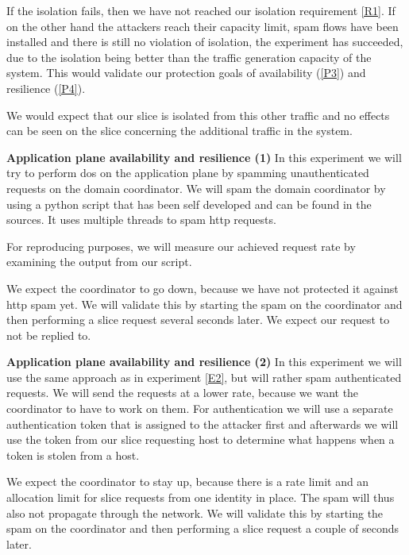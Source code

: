 \begin{description}[style=multiline, labelwidth=0.7cm]
    If the isolation fails, then we have not reached our isolation requirement \ref{R1}. If on the other hand the attackers reach their capacity limit, spam flows have been installed and there is still no violation of isolation, the experiment has succeeded, due to the isolation being better than the traffic generation capacity of the system. This would validate our protection goals of availability (\ref{P3}) and resilience (\ref{P4}).

    We would expect that our slice is isolated from this other traffic and no effects can be seen on the slice concerning the additional traffic in the system.

    \item[\namedlabel{E2}{E2}] \textbf{Application plane availability and resilience (1)} In this experiment we will try to perform \acrshort{dos} on the application plane by spamming unauthenticated requests on the domain coordinator. We will spam the domain coordinator by using a python script that has been self developed and can be found in the sources. It uses multiple threads to spam http requests.

    For reproducing purposes, we will measure our achieved request rate by examining the output from our script.

    We expect the coordinator to go down, because we have not protected it against http spam yet. We will validate this by starting the spam on the coordinator and then performing a slice request several seconds later. We expect our request to not be replied to.

    \item[\namedlabel{E3}{E3}] \textbf{Application plane availability and resilience (2)} In this experiment we will use the same approach as in experiment \ref{E2}, but will rather spam authenticated requests. We will send the requests at a lower rate, because we want the coordinator to have to work on them. For authentication we will use a separate authentication token that is assigned to the attacker first and afterwards we will use the token from our slice requesting host to determine what happens when a token is stolen from a host.

    We expect the coordinator to stay up, because there is a rate limit and an allocation limit for slice requests from one identity in place. The spam will thus also not propagate through the network. We will validate this by starting the spam on the coordinator and then performing a slice request a couple of seconds later.


\end{description}
